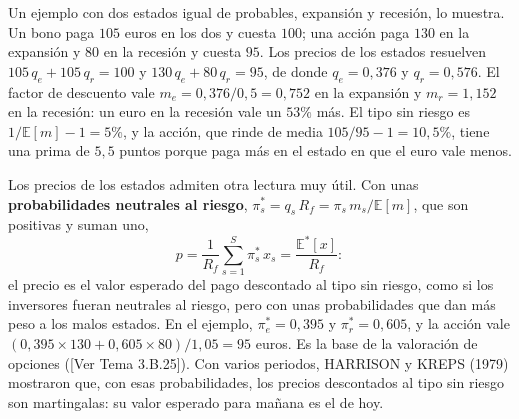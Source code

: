 \documentclass[10pt,a4paper]{article}
\newcommand{\authorfont}[1]{{\fontfamily{EBGaramond-TLF}\selectfont #1}}
\begin{document}
Un ejemplo con dos estados igual de probables, expansión y recesión, lo muestra. Un bono paga $105$ euros en los dos y cuesta $100$; una acción paga $130$ en la expansión y $80$ en la recesión y cuesta $95$. Los precios de los estados resuelven $105\,q_e+105\,q_r=100$ y $130\,q_e+80\,q_r=95$, de donde $q_e=0{,}376$ y $q_r=0{,}576$. El factor de descuento vale $m_e=0{,}376/0{,}5=0{,}752$ en la expansión y $m_r=1{,}152$ en la recesión: un euro en la recesión vale un $53\%$ más. El tipo sin riesgo es $1/\mathbb E[m]-1=5\%$, y la acción, que rinde de media $105/95-1=10{,}5\%$, tiene una prima de $5{,}5$ puntos porque paga más en el estado en que el euro vale menos.

Los precios de los estados admiten otra lectura muy útil. Con unas \textbf{probabilidades neutrales al riesgo}, $\pi_s^*=q_s\,R_f=\pi_s\,m_s/\mathbb E[m]$, que son positivas y suman uno,
$$p=\frac{1}{R_f}\sum_{s=1}^S\pi_s^*\,x_s=\frac{\mathbb E^*[x]}{R_f}:$$
el precio es el valor esperado del pago descontado al tipo sin riesgo, como si los inversores fueran neutrales al riesgo, pero con unas probabilidades que dan más peso a los malos estados. En el ejemplo, $\pi_e^*=0{,}395$ y $\pi_r^*=0{,}605$, y la acción vale $(0{,}395\times130+0{,}605\times80)/1{,}05=95$ euros. Es la base de la valoración de opciones ([\authorfont{Ver Tema 3.B.25}]). Con varios periodos, HARRISON y KREPS (1979) mostraron que, con esas probabilidades, los precios descontados al tipo sin riesgo son martingalas: su valor esperado para mañana es el de hoy.
\end{document}
